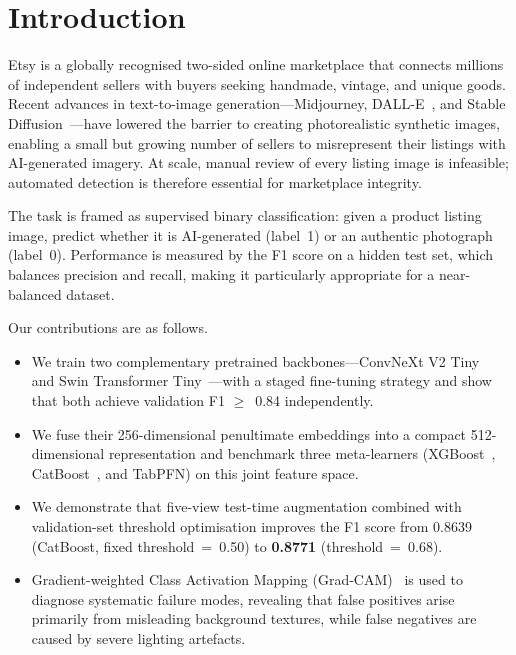 \documentclass[conference]{IEEEtran}
\begin{document}
\section{Introduction}

Etsy is a globally recognised two-sided online marketplace that connects millions
of independent sellers with buyers seeking handmade, vintage, and unique goods.
Recent advances in text-to-image generation—Midjourney, DALL-E~\cite{ramesh2022dalle},
and Stable Diffusion~\cite{rombach2022latent}—have lowered the barrier to creating
photorealistic synthetic images, enabling a small but growing number of sellers to
misrepresent their listings with AI-generated imagery.  At scale, manual review of
every listing image is infeasible; automated detection is therefore essential for
marketplace integrity.

The task is framed as supervised binary classification: given a product listing
image, predict whether it is AI-generated (label~1) or an authentic photograph
(label~0).  Performance is measured by the F1 score on a hidden test set, which
balances precision and recall, making it particularly appropriate for a
near-balanced dataset.

Our contributions are as follows.
\begin{itemize}
  \item We train two complementary pretrained backbones—ConvNeXt V2
        Tiny~\cite{woo2023convnextv2} and Swin Transformer
        Tiny~\cite{liu2021swin}—with a staged fine-tuning strategy and show
        that both achieve validation F1 ${\geq}$~0.84 independently.
  \item We fuse their 256-dimensional penultimate embeddings into a compact
        512-dimensional representation and benchmark three meta-learners
        (XGBoost~\cite{chen2016xgboost}, CatBoost~\cite{prokhorenkova2018catboost},
        and TabPFN) on this joint feature space.
  \item We demonstrate that five-view test-time augmentation combined with
        validation-set threshold optimisation improves the F1 score from 0.8639
        (CatBoost, fixed threshold~=~0.50) to \textbf{0.8771} (threshold~=~0.68).
  \item Gradient-weighted Class Activation Mapping (Grad-CAM)~\cite{selvaraju2017gradcam}
        is used to diagnose systematic failure modes, revealing that false
        positives arise primarily from misleading background textures, while
        false negatives are caused by severe lighting artefacts.
\end{itemize}
\end{document}
